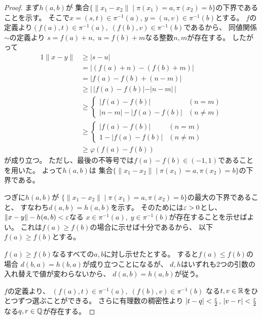 \documentclass[report]{jlreq}
\begin{document}
\begin{proof}
    まず$h(a, b)$が
    集合$\{ \| x_1 - x_2 \| \mid \pi(x_1) = a, \pi(x_2) = b\}$の下界であることを示す。
    そこで$x = (s, t) \in \pi^{-1}(a)$, \; $y = (u, v) \in \pi^{-1}(b)$とする。
    $f$の定義より$(f(a), t) \in \pi^{-1}(a), \; (f(b), v) \in \pi^{-1}(b)$であるから、
    同値関係$\sim$の定義より
    $s = f(a) + n, \; u = f(b) + m$なる整数$n, m$が存在する。
    したがって
    \begin{alignat}{1}
        \| x - y \|
            &\ge |s - u| \\
            &= |(f(a) + n) - (f(b) + m)| \\
            &= |f(a) - f(b) + (n - m)| \\
            &\ge | \, |f(a) - f(b)| - |n - m| \, | \\
            &\ge \begin{cases}
                |f(a) - f(b)| & (n = m) \\
                |n - m| - |f(a) - f(b)| & (n \neq m)
            \end{cases} \\
            &\ge \begin{cases}
                |f(a) - f(b)| & (n = m) \\
                1 - |f(a) - f(b)| & (n \neq m)
            \end{cases} \\
            &\ge \varphi(f(a) - f(b))
    \end{alignat}
    が成り立つ。
    ただし、最後の不等号では$f(a) - f(b) \in (-1, 1)$であることを用いた。
    よって$h(a, b)$は
    集合$\{ \| x_1 - x_2 \| \mid \pi(x_1) = a, \pi(x_2) = b\}$の下界である。

    つぎに$h(a, b)$が
    $\{ \| x_1 - x_2 \| \mid \pi(x_1) = a, \pi(x_2) = b\}$の最大の下界であること、
    すなわち$d(a, b) = h(a, b)$を示す。
    そのためには$\varepsilon > 0$とし、
    $\| x - y \| - h(a, b) < \varepsilon$なる
    $x \in \pi^{-1}(a), \; y \in \pi^{-1}(b)$が存在することを示せばよい。
    これは$f(a) \ge f(b)$の場合に示せば十分であるから、
    以下$f(a) \ge f(b)$とする。
    \begin{innerproof}
        $f(a) \ge f(b)$なるすべての$a, b$に対し示せたとする。
        すると$f(a) \le f(b)$の場合
        $d(b, a) = h(b, a)$が成り立つことになるが、
        $d, h$はいずれも2つの引数の入れ替えで値が変わらないから、
        $d(a, b) = h(a, b)$が従う。
    \end{innerproof}
    $f$の定義より、
    $(f(a), t) \in \pi^{-1}(a), \; (f(b), v) \in \pi^{-1}(b)$
    なる$t, v \in \mathbb{R}$をひとつずつ選ぶことができる。
    さらに有理数の稠密性より
    $|t - q| < \frac{\varepsilon}{2}$, \; $|v - r| < \frac{\varepsilon}{2}$
    なる$q, r \in \mathbb{Q}$が存在する。


\end{proof}
\end{document}
